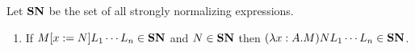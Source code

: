 
Let $\mathbf{SN}$ be the set of all strongly normalizing expressions.

\begin{lemma}
\label{lm:SN}
\label{lm:SNothers} %
\begin{enumerate}
\item
If $M[x:=N]L_1 \cdots L_n \in \mathbf{SN}$ and $N \in \mathbf{SN}$ then $(\lambda x:A.M)NL_1 \cdots L_n \in \mathbf{SN}$.

\end{enumerate}
\end{lemma}
